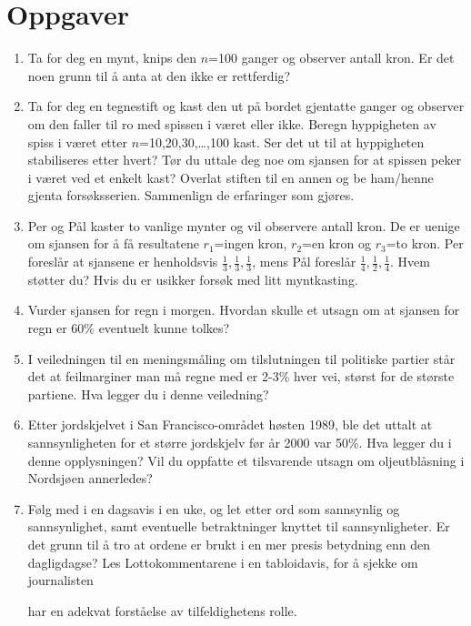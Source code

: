 \section{Oppgaver}
\small
\begin{enumerate}
\item
Ta for deg en mynt, knips den $n$=100 ganger og observer antall
kron. Er det noen grunn til å anta at den ikke er rettferdig?
\item
Ta for deg en tegnestift og kast den ut på bordet gjentatte
ganger og observer om den faller til ro med spissen i været eller
ikke. Beregn hyppigheten av spiss i været etter $n$=10,20,30,\ldots,100
kast. Ser det ut til at hyppigheten stabiliseres etter hvert?
Tør du uttale deg noe om sjansen for at spissen peker i været ved
et enkelt kast? Overlat stiften til en annen og be ham/henne
gjenta forsøksserien. Sammenlign de erfaringer som gjøres.
\item
Per og Pål kaster to vanlige mynter og vil observere antall kron.
De er uenige om sjansen for å få resultatene $r_{1}$=ingen kron,
$r_{2}$=en kron og $r_{3}$=to kron. Per foreslår at sjansene er henholdsvis
$\frac{1}{3},\frac{1}{3},\frac{1}{3}$, mens Pål foreslår
$\frac{1}{4},\frac{1}{2},\frac{1}{4}$. Hvem støtter du?
Hvis du er usikker forsøk med litt myntkasting.
\item
Vurder sjansen for regn i morgen. Hvordan skulle et utsagn om at
sjansen for regn er 60\% eventuelt kunne tolkes?
\item
I veiledningen til en meningsmåling om tilslutningen til politiske
partier står det at feilmarginer man må regne med er 2-3\% hver vei,
størst for de største partiene. Hva legger du i denne veiledning?
\item
Etter jordskjelvet i San Francisco-området høsten 1989, ble det uttalt
at sannsynligheten for et større jordskjelv før år 2000 var 50\%.
Hva legger du i denne opplysningen?
Vil du oppfatte et tilsvarende utsagn om oljeutblåsning i Nordsjøen
annerledes?
\item
Følg med i en dagsavis i en uke, og let etter ord som sannsynlig og
sannsynlighet, samt eventuelle betraktninger knyttet til sannsynligheter.
Er det grunn til å tro at ordene er brukt i en mer presis betydning
enn den dagligdagse?
Les Lottokommentarene i en tabloidavis, for å sjekke om journalisten

har en adekvat forståelse av tilfeldighetens rolle.


\end{enumerate}
